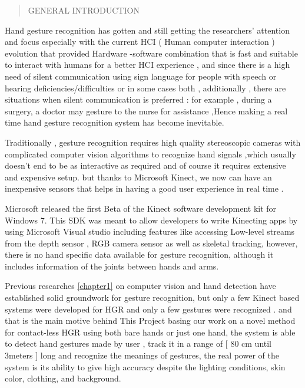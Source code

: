 \begin{quote}
 
\centering

    {
\huge 

GENERAL  INTRODUCTION 

}
\end{quote}


\vspace{1.5cm}

Hand gesture recognition  has gotten and still getting the researchers' attention and focus especially with the current HCI ( Human computer interaction ) evolution that provided Hardware -software  combination that is fast and suitable to interact with humans for a better HCI experience , and since there is a high need of silent communication using sign language for people with speech or  hearing  deficiencies/difficulties or in some cases both , additionally , there are situations when silent communication is preferred : for example , during a surgery,  a doctor may gesture to the nurse for assistance ,Hence making a real time  hand gesture recognition system has become inevitable.

Traditionally , gesture recognition requires high quality stereoscopic cameras with complicated computer vision algorithms to recognize hand signals ,which usually doesn't end to be as interactive as required and of course it requires extensive and expensive setup. but thanks to Microsoft  Kinect, we now can have  an inexpensive  sensors  that helps in having a good user experience in real time .

Microsoft released the first Beta of the Kinect software development kit for Windows 7. This SDK was meant to allow developers to write Kinecting apps by using Microsoft Visual studio including features like accessing Low-level streams from the depth sensor , RGB camera sensor   as well as skeletal  tracking, however,  there  is no hand  specific  data  available for  gesture   recognition,   although    it   includes   information  of the  joints   between  hands   and  arms.

Previous   researches  \ref{chapter1}  on  computer   vision  and hand   detection   have established   solid  groundwork    for gesture   recognition, but  only  a  few  Kinect based   systems  were  developed   for  HGR    and  only  a  few  gestures were recognized . and that is  the main motive behind This Project basing our work on a novel method for contact-less HGR using both bare hands or just  one hand, the system is able to detect hand gestures  made by user , track it  in a range of [ 80 cm until 3meters ] long  and  recognize the meanings of gestures, the real power of the system is its ability to give high accuracy  despite the lighting  conditions,   skin color, clothing,  and background.

